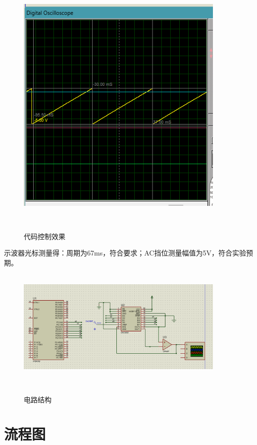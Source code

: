 \documentclass[12pt,hyperref,a4paper,UTF8]{ctexart}
\begin{document}
\begin{figure}[H] %
    \centering
    \includegraphics[width=0.9\textwidth]{figures/201.png} %
    \caption{代码控制效果} %
    \label{fig:example} %
\end{figure}

示波器光标测量得：周期为67ms，符合要求；AC挡位测量幅值为5V，符合实验预期。

\begin{figure}[H] %
    \centering
    \includegraphics[width=0.9\textwidth]{figures/202.png} %
    \caption{电路结构} %
    \label{fig:example} %
\end{figure}

\section{流程图}
\end{document}
